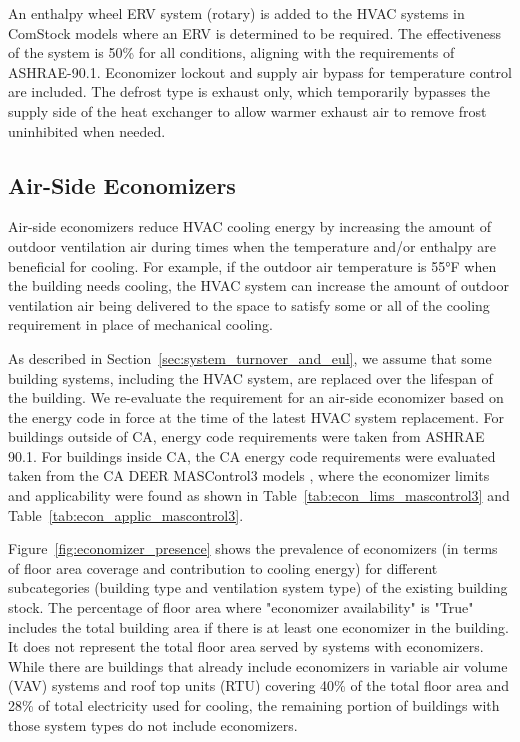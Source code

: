 


An enthalpy wheel ERV system (rotary) is added to the HVAC systems in ComStock models where an ERV is determined to be required. The effectiveness of the system is 50\% for all conditions, aligning with the requirements of ASHRAE-90.1. Economizer lockout and supply air bypass for temperature control are included. The defrost type is exhaust only, which temporarily bypasses the supply side of the heat exchanger to allow warmer exhaust air to remove frost uninhibited when needed.

\subsection{Air-Side Economizers}

Air-side economizers reduce HVAC cooling energy by increasing the amount of outdoor ventilation air during times when the temperature and/or enthalpy are beneficial for cooling. For example, if the outdoor air temperature is 55°F when the building needs cooling, the HVAC system can increase the amount of outdoor ventilation air being delivered to the space to satisfy some or all of the cooling requirement in place of mechanical cooling.

As described in Section~\ref{sec:system_turnover_and_eul}, we assume that some building systems, including the HVAC system, are replaced over the lifespan of the building. We re-evaluate the requirement for an air-side economizer based on the energy code in force at the time of the latest HVAC system replacement. For buildings outside of CA, energy code requirements were taken from ASHRAE 90.1. For buildings inside CA, the CA energy code requirements were evaluated taken from the CA DEER MASControl3 models \citep{mascontrol3}, where the economizer limits and applicability were found as shown in Table~\ref{tab:econ_lims_mascontrol3} and Table~\ref{tab:econ_applic_mascontrol3}.





Figure~\ref{fig:economizer_presence} shows the prevalence of economizers (in terms of floor area coverage and contribution to cooling energy) for different subcategories (building type and ventilation system type) of the existing building stock. The percentage of floor area where "economizer availability" is "True" includes the total building area if there is at least one economizer in the building. It does not represent the total floor area served by systems with economizers. While there are buildings that already include economizers in variable air volume (VAV) systems and roof top units (RTU) covering 40\% of the total floor area and 28\% of total electricity used for cooling, the remaining portion of buildings with those system types do not include economizers.

